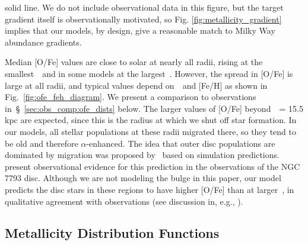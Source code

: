 \documentclass[draft2.tex]{subfiles}
\begin{document}
solid line. We do not include observational data in this figure, but the target 
gradient itself is observationally motivated, so Fig. 
\ref{fig:metallicity_gradient} implies that our models, by design, give a 
reasonable match to Milky Way abundance gradients. 
\par 
Median [O/Fe] values are close to solar at nearly all radii, rising at the 
smallest~\rgal~and in some models at the largest~\rgal. However, the spread in 
[O/Fe] is large at all radii, and typical values depend on~\absz~and [Fe/H] as 
shown in Fig.~\ref{fig:ofe_feh_diagram}. 
We present a comparison to observations in~\S~\ref{sec:obs_comp:ofe_dists} 
below. 
The larger values of [O/Fe] beyond~\rgal~= 15.5 kpc are expected, since this is 
the radius at which we shut off star formation. In our models, all stellar 
populations at these radii migrated there, so they tend to be old and therefore 
$\alpha$-enhanced. 
The idea that outer disc populations are dominated by migration was proposed 
by~\citet{Roskar2008b} based on simulation predictions. 
\citet{RadburnSmith2012} present observational evidence for this prediction in 
the observations of the NGC 7793 disc. 
Although we are not modeling the bulge in this paper, our model predicts the 
disc stars in these regions to have higher [O/Fe] than at larger~\rgal, in 
qualitative agreement with observations (see discussion in, e.g., 
\citealp{Duong2019, Griffith2021a}). 

\subsection{Metallicity Distribution Functions} 
\label{sec:obs_comp:mdfs} 
\end{document}
